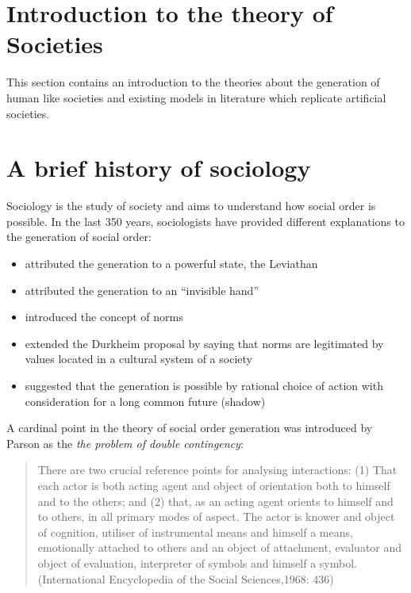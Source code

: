 \section{Introduction to the theory of Societies \label{Chapter1:SocialSystemTheory}}

This section contains an introduction to the theories about the generation of
human like societies and existing models in literature which replicate
artificial societies.

\section{A brief history of sociology}
Sociology is the study of society and aims to understand how social order is
possible.
In the last 350 years, sociologists have provided different explanations to the
generation of social order:
\begin{itemize}
 \item \citet{Thomas1651:Leviathan} attributed the generation to
a powerful state, the Leviathan
 \item \citet{Smith1776:WealthNations} attributed the generation
to an ``invisible hand''
 \item \citet{Durkheim1893} introduced the concept of norms
 \item \citet{Parsons1937:StructureSocialAim} extended the
Durkheim proposal by saying that norms are legitimated by values located in a
cultural system of a society
 \item \citet{Axelrod1984} suggested that the generation is
possible by rational choice of action with consideration for a long common future
(shadow)
\end{itemize}
A cardinal point in the theory of social order generation was introduced by
Parson as the \textit{the problem of double contingency}:
\begin{quote}
There are two crucial reference points for analysing interactions:
(1) That each actor is both acting agent and object of orientation both to
himself and to the others; and (2) that, as an acting agent orients to himself and
to others, in all primary modes of aspect. The actor is knower and object
of cognition, utiliser of instrumental means and himself a means, emotionally
attached to others and an object of attachment, evaluator and object of
evaluation, interpreter of symbols and himself a symbol. 
(International Encyclopedia of the Social Sciences,1968: 436)
\end{quote}

